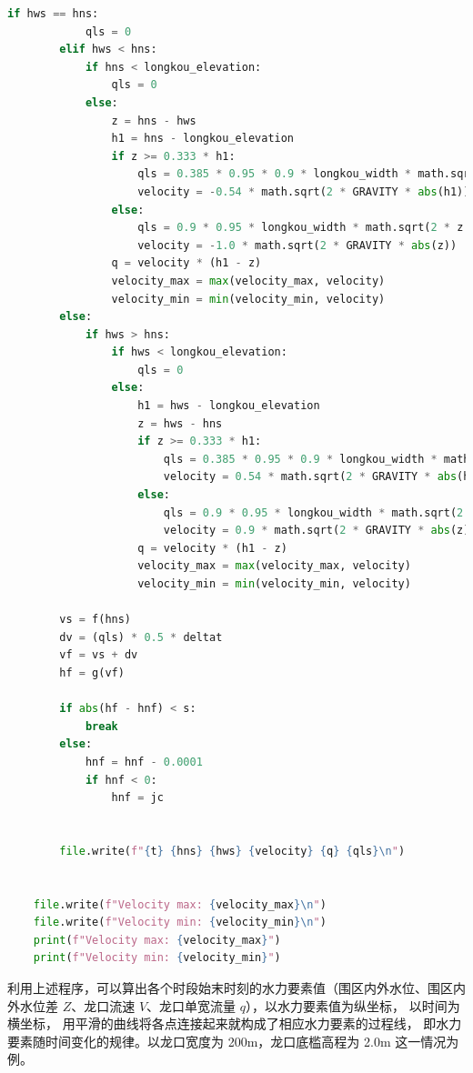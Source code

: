 \documentclass[UTF8, a4paper, 12pt]{ctexart} %
\begin{document}
\begin{lstlisting}[language=Python]
        if hws == hns:
            qls = 0
        elif hws < hns:
            if hns < longkou_elevation:
                qls = 0
            else:
                z = hns - hws
                h1 = hns - longkou_elevation
                if z >= 0.333 * h1:
                    qls = 0.385 * 0.95 * 0.9 * longkou_width * math.sqrt(2 * GRAVITY) * h1 * math.sqrt(h1)
                    velocity = -0.54 * math.sqrt(2 * GRAVITY * abs(h1))
                else:
                    qls = 0.9 * 0.95 * longkou_width * math.sqrt(2 * z * GRAVITY) * (h1 - z)
                    velocity = -1.0 * math.sqrt(2 * GRAVITY * abs(z))
                q = velocity * (h1 - z)
                velocity_max = max(velocity_max, velocity)
                velocity_min = min(velocity_min, velocity)
        else:
            if hws > hns:
                if hws < longkou_elevation:
                    qls = 0
                else:
                    h1 = hws - longkou_elevation
                    z = hws - hns
                    if z >= 0.333 * h1:
                        qls = 0.385 * 0.95 * 0.9 * longkou_width * math.sqrt(2 * GRAVITY) * h1 * math.sqrt(h1)
                        velocity = 0.54 * math.sqrt(2 * GRAVITY * abs(h1))
                    else:
                        qls = 0.9 * 0.95 * longkou_width * math.sqrt(2 * GRAVITY * z) * (h1 - z)
                        velocity = 0.9 * math.sqrt(2 * GRAVITY * abs(z)) * z / abs(z)
                    q = velocity * (h1 - z)
                    velocity_max = max(velocity_max, velocity)
                    velocity_min = min(velocity_min, velocity)
        
        vs = f(hns)
        dv = (qls) * 0.5 * deltat
        vf = vs + dv
        hf = g(vf)

        if abs(hf - hnf) < s:
            break
        else:
            hnf = hnf - 0.0001
            if hnf < 0:
                hnf = jc

   
        file.write(f"{t} {hns} {hws} {velocity} {q} {qls}\n")

    
    file.write(f"Velocity max: {velocity_max}\n")
    file.write(f"Velocity min: {velocity_min}\n")
    print(f"Velocity max: {velocity_max}")
    print(f"Velocity min: {velocity_min}")

\end{lstlisting}

利用上述程序，可以算出各个时段始末时刻的水力要素值（围区内外水位、围区内外水位差 $Z$、龙口流速 $V$、龙口单宽流量 $q$），以水力要素值为纵坐标，
以时间为横坐标，
用平滑的曲线将各点连接起来就构成了相应水力要素的过程线，
即水力要素随时间变化的规律。以龙口宽度为 200m，龙口底槛高程为 2.0m 这一情况为例。
\end{document}

